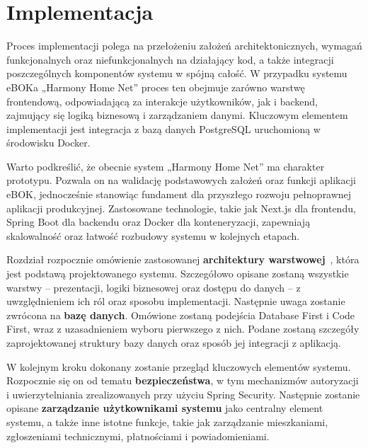 \chapter{Implementacja}
Proces implementacji polega na przełożeniu założeń architektonicznych, wymagań funkcjonalnych oraz niefunkcjonalnych na działający kod, a także integracji poszczególnych komponentów systemu w spójną całość. W przypadku systemu eBOKa „Harmony Home Net” proces ten obejmuje zarówno warstwę frontendową, odpowiadającą za interakcje użytkowników, jak i backend, zajmujący się logiką biznesową i zarządzaniem danymi. Kluczowym elementem implementacji jest integracja z bazą danych PostgreSQL uruchomioną w środowisku Docker.

Warto podkreślić, że obecnie system „Harmony Home Net” ma charakter prototypu. Pozwala on na walidację podstawowych założeń oraz funkcji aplikacji eBOK, jednocześnie stanowiąc fundament dla przyszłego rozwoju pełnoprawnej aplikacji produkcyjnej. Zastosowane technologie, takie jak Next.js dla frontendu, Spring Boot dla backendu oraz Docker dla konteneryzacji, zapewniają skalowalność oraz łatwość rozbudowy systemu w kolejnych etapach.

Rozdział rozpocznie omówienie zastosowanej \textbf{architektury warstwowej}~\cite{n_tier_wiki}, która jest podstawą projektowanego systemu. Szczegółowo opisane zostaną wszystkie warstwy – prezentacji, logiki biznesowej oraz dostępu do danych – z uwzględnieniem ich ról oraz sposobu implementacji. Następnie uwaga zostanie zwrócona na \textbf{bazę danych}. Omówione zostaną podejścia Database First i Code First, wraz z uzasadnieniem wyboru pierwszego z nich. Podane zostaną szczegóły zaprojektowanej struktury bazy danych oraz sposób jej integracji z aplikacją.

W kolejnym kroku dokonany zostanie przegląd kluczowych elementów systemu. Rozpocznie się on od tematu \textbf{bezpieczeństwa}, w tym mechanizmów autoryzacji i uwierzytelniania zrealizowanych przy użyciu Spring Security. Następnie zostanie opisane \textbf{zarządzanie użytkownikami systemu} jako centralny element systemu, a także inne istotne funkcje, takie jak zarządzanie mieszkaniami, zgłoszeniami technicznymi, płatnościami i powiadomieniami.




